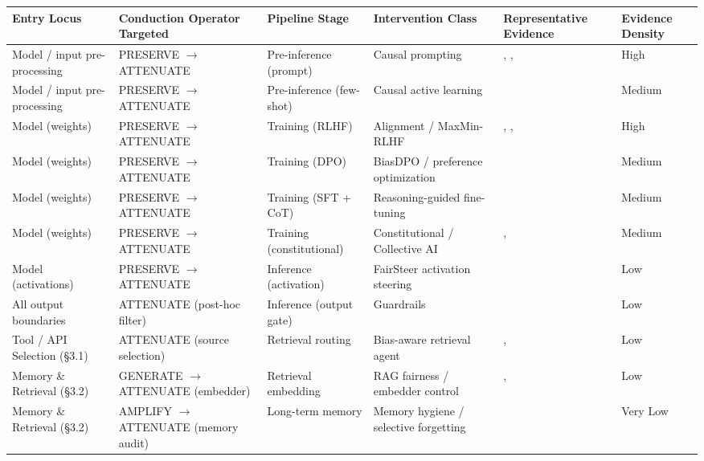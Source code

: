 \documentclass[10pt]{article}
\begin{document}
\begin{center}\footnotesize
\begin{longtable}{|p{}|p{}|p{}|p{}|p{}|p{}|}
\hline \textbf{Entry Locus} & \textbf{Conduction Operator Targeted} & \textbf{Pipeline Stage} & \textbf{Intervention Class} & \textbf{Representative Evidence} & \textbf{Evidence Density} \\ \hline\endhead
Model / input pre-processing & PRESERVE $\rightarrow$ ATTENUATE & Pre-inference (prompt) & Causal prompting & \cite{li2024prompting}, \cite{zhang2024causal}, \cite{furniturewala2024thinking} & High \\ \hline
Model / input pre-processing & PRESERVE $\rightarrow$ ATTENUATE & Pre-inference (few-shot) & Causal active learning & \cite{du2024causal} & Medium \\ \hline
Model (weights) & PRESERVE $\rightarrow$ ATTENUATE & Training (RLHF) & Alignment / MaxMin-RLHF & \cite{ouyang2022training}, \cite{chakraborty2024maxmin}, \cite{xiao2024algorithmic} & High \\ \hline
Model (weights) & PRESERVE $\rightarrow$ ATTENUATE & Training (DPO) & BiasDPO / preference optimization & \cite{allam2024biasdpo} & Medium \\ \hline
Model (weights) & PRESERVE $\rightarrow$ ATTENUATE & Training (SFT + CoT) & Reasoning-guided fine-tuning & \cite{kabra2025reasoning} & Medium \\ \hline
Model (weights) & PRESERVE $\rightarrow$ ATTENUATE & Training (constitutional) & Constitutional / Collective AI & \cite{bai2022constitutional}, \cite{huang2024collective} & Medium \\ \hline
Model (activations) & PRESERVE $\rightarrow$ ATTENUATE & Inference (activation) & FairSteer activation steering & \cite{li2025fairsteer} & Low \\ \hline
All output boundaries & ATTENUATE (post-hoc filter) & Inference (output gate) & Guardrails & \cite{dong2024building} & Low \\ \hline
Tool / API Selection (\S{}3.1) & ATTENUATE (source selection) & Retrieval routing & Bias-aware retrieval agent & \cite{singh2025bias}, \cite{singh2025biasb} & Low \\ \hline
Memory \& Retrieval (\S{}3.2) & GENERATE $\rightarrow$ ATTENUATE (embedder) & Retrieval embedding & RAG fairness / embedder control & \cite{kim2024fair}, \cite{kim2025mitigating} & Low \\ \hline
Memory \& Retrieval (\S{}3.2) & AMPLIFY $\rightarrow$ ATTENUATE (memory audit) & Long-term memory & Memory hygiene / selective forgetting & \cite{ma2026implicit} & Very Low \\ \hline

\end{longtable}
\end{center}
\end{document}
